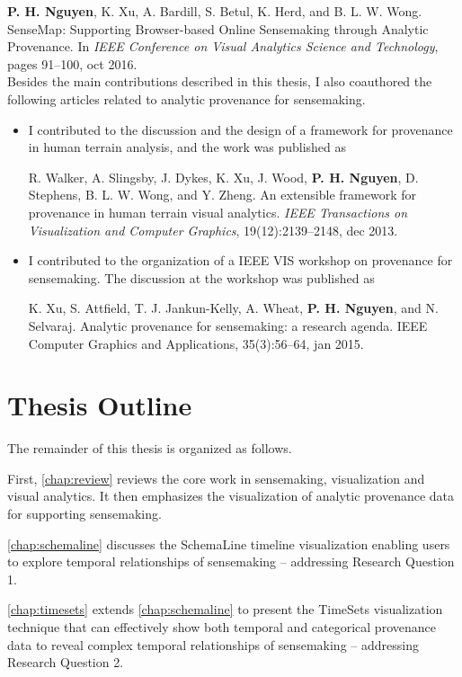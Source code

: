 \textbf{P. H. Nguyen}, K. Xu, A. Bardill, S. Betul, K. Herd, and B. L. W. Wong. SenseMap: Supporting Browser-based Online Sensemaking through Analytic Provenance. In \textit{IEEE Conference on Visual Analytics Science and Technology}, pages 91--100, oct 2016.
\\

\noindent Besides the main contributions described in this thesis, I also coauthored the following articles related to analytic provenance for sensemaking.

\begin{itemize}
	\item I contributed to the discussion and the design of a framework for provenance in human terrain analysis, and the work was published as

	\quad R. Walker, A. Slingsby, J. Dykes, K. Xu, J. Wood, \textbf{P. H. Nguyen}, D. Stephens, B. L. W. Wong, and Y. Zheng. An extensible framework for provenance in human terrain visual analytics. \textit{IEEE Transactions on Visualization and Computer Graphics}, 19(12):2139--2148, dec 2013.

	\item I contributed to the organization of a IEEE VIS workshop on provenance for sensemaking. The discussion at the workshop was published as

	\quad K. Xu, S. Attfield, T. J. Jankun-Kelly, A. Wheat, \textbf{P. H. Nguyen}, and N. Selvaraj. Analytic provenance for sensemaking: a research agenda. IEEE Computer Graphics and Applications, 35(3):56--64, jan 2015.
\end{itemize}

\section{Thesis Outline}
The remainder of this thesis is organized as follows.

First, \autoref{chap:review} reviews the core work in sensemaking, visualization and visual analytics. It then emphasizes the visualization of analytic provenance data for supporting sensemaking.

\autoref{chap:schemaline} discusses the SchemaLine timeline visualization enabling users to explore temporal relationships of sensemaking -- addressing Research Question 1.

\autoref{chap:timesets} extends \autoref{chap:schemaline} to present the TimeSets visualization technique that can effectively show both temporal and categorical provenance data to reveal complex temporal relationships of sensemaking -- addressing Research Question 2.


